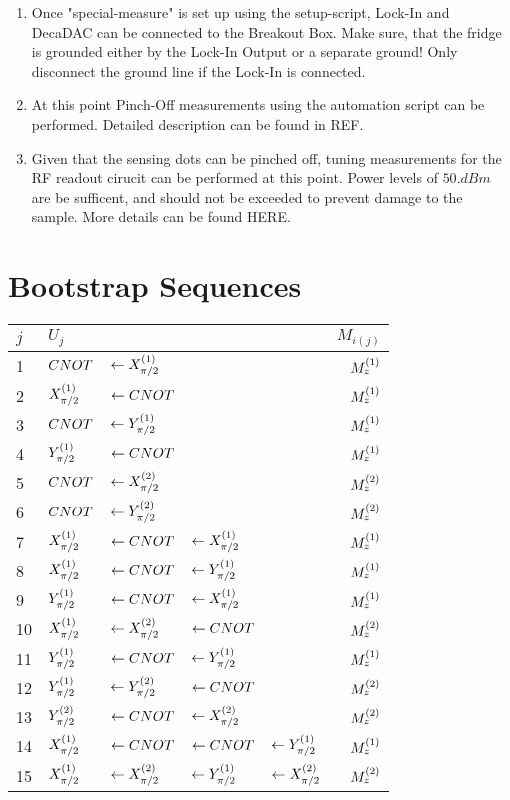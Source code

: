 \begin{appendix}
\begin{enumerate}
\item Once "special-measure" is set up using the setup-script, Lock-In and DecaDAC can be connected to the Breakout Box. Make sure, that the fridge is grounded either by the Lock-In Output or a separate ground! Only disconnect the ground line if the Lock-In is connected.
\item At this point Pinch-Off measurements using the automation script can be performed. Detailed description can be found in REF.
\item Given that the sensing dots can be pinched off, tuning measurements for the RF readout cirucit can be performed at this point. Power levels of $\si{50.dBm}$ are be sufficent, and should not be exceeded to prevent damage to the sample. More details can be found HERE.

\end{enumerate}



\newpage
\section{Bootstrap Sequences}

\begin{table}[htbp]
        \centering
        \begin{tabular}{l | l l l l|r} \hline 
            $j$ &$U_j$  &&&&   $M_{i(j)}$\\ \hline \hline
       
            1&$CNOT $&$\leftarrow X_{\pi/2}^{(1)}$   &&&   $M_{z}^{(1)}$ \\ 
            2& $X_{\pi/2}^{(1)} $&$\leftarrow CNOT$   &&&   $M_{z}^{(1)}$ \\ 
            3&$CNOT $&$\leftarrow Y_{\pi/2}^{(1)}$   &&&   $M_{z}^{(1)}$ \\ 
            4&$Y_{\pi/2}^{(1)}$&$\leftarrow CNOT$   &&&   $M_{z}^{(1)}$ \\
            5&$CNOT $&$\leftarrow X_{\pi/2}^{(2)}$    &&&   $M_{z}^{(2)}$ \\
            6&$CNOT $&$\leftarrow Y_{\pi/2}^{(2)}$    &&&   $M_{z}^{(2)}$ \\
            7&$X_{\pi/2}^{(1)} $&   $\leftarrow CNOT$ & $\leftarrow X_{\pi/2}^{(1)}$  &&   $M_{z}^{(1)}$ \\ 
            8&$X_{\pi/2}^{(1)} $&   $\leftarrow CNOT$ & $\leftarrow Y_{\pi/2}^{(1)}$  &&   $M_{z}^{(1)}$ \\  
            9&$Y_{\pi/2}^{(1)} $&   $\leftarrow CNOT$ & $\leftarrow X_{\pi/2}^{(1)}$  &&   $M_{z}^{(1)}$ \\ 
            10&$X_{\pi/2}^{(1)} $&   $\leftarrow X_{\pi/2}^{(2)}$ & $\leftarrow CNOT$  &&   $M_{z}^{(2)}$ \\ 
            11& $Y_{\pi/2}^{(1)} $&   $\leftarrow CNOT$ & $\leftarrow Y_{\pi/2}^{(1)}$  &&   $M_{z}^{(1)}$ \\  
            12&$Y_{\pi/2}^{(1)} $&   $\leftarrow Y_{\pi/2}^{(2)}$ & $\leftarrow CNOT$  &&   $M_{z}^{(2)}$ \\ 
            13&$Y_{\pi/2}^{(2)} $&   $\leftarrow CNOT$ & $\leftarrow X_{\pi/2}^{(2)}$  &&   $M_{z}^{(2)}$ \\ 
            14&$X_{\pi/2}^{(1)} $&   $\leftarrow CNOT$ & $\leftarrow CNOT$  & $\leftarrow Y_{\pi/2}^{(1)} $&   $M_{z}^{(1)}$ \\ 
            15&$X_{\pi/2}^{(1)} $&   $\leftarrow X_{\pi/2}^{(2)}$ & $\leftarrow Y_{\pi/2}^{(1)}$  & $\leftarrow X_{\pi/2}^{(2)}$&   $M_{z}^{(2)}$ \\  \hline
            

\end{tabular}
\end{table}
\end{appendix}
